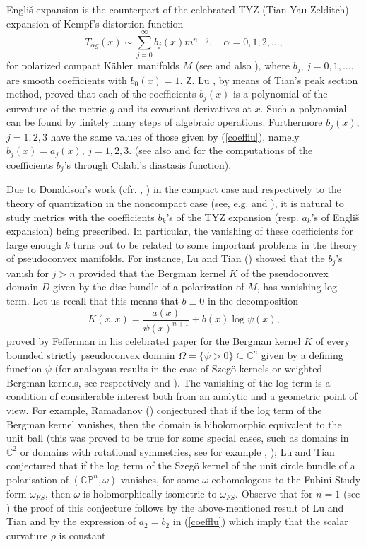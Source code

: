\documentclass[11pt, reqno]{amsart}
\begin{document}
Engli\v{s} expansion is the counterpart of the celebrated TYZ (Tian-Yau-Zelditch) expansion
of Kempf's distortion function
$$T_{\alpha g}(x) \sim
\sum_{j=0}^\infty  b_j(x)m^{n-j},\quad \alpha=0,1,2,\dots,$$
 for polarized compact {K\"{a}hler}\ manifolds $M$ (see  \cite{ze}
and  also \cite{arlquant}),
where  $b_j$, $j=0,1, \ldots$, are smooth coefficients with $b_0(x)=1$.
Z. Lu \cite{lu}, by means of  Tian's peak section method,
proved  that  each of the coefficients $b_j(x)$
 is a polynomial of the curvature  of the metric $g$ and its covariant
derivatives at $x$. Such a polynomial can be
found by finitely many steps of algebraic operations. Furthermore
$b_j(x)$, $j=1, 2, 3$ have the same values of those given by
(\ref{coefflu}), namely $b_j(x)=a_j(x)$, $j=1, 2, 3$.
(see also \cite{loianal} and \cite{loismooth} for the
computations of the coefficients $b_j$'s through Calabi's
diastasis function).

Due to Donaldson's work (cfr. \cite{donaldson},
\cite{do2}) in the compact case and respectively to the theory of
quantization  in the noncompact case (see, e.g. \cite{Ber1} and \cite{CGR}),
 it is  natural to study metrics with the coefficients $b_k$'s of  the  TYZ expansion
 (resp.    $a_k$'s of  Engli\v{s} expansion)  being prescribed. In particular, the vanishing of these coefficients for large enough $k$ turns out to be related to some important problems in the theory of pseudoconvex manifolds. For instance, Lu and Tian (\cite{lutian}) showed that the $b_j$'s vanish for $j > n$ provided that the Bergman kernel $K$ of the pseudoconvex domain $D$ given by the disc bundle of a polarization of $M$, has vanishing log term. Let us recall that this means that $b \equiv 0$ in the decomposition
\begin{equation}\label{fefferman}
K(x,x) = \frac{a(x)}{\psi(x)^{n+1}} + b(x) \log \psi(x) ,
\end{equation}
proved by Fefferman in his celebrated paper \cite{F} for the Bergman kernel $K$ of every bounded strictly pseudoconvex domain $\Omega = \{\psi > 0 \} \subseteq {\mathbb{C}}^n$ given by a defining function $\psi$ (for analogous results in the case of Szeg\"{o} kernels or weighted Bergman kernels, see respectively \cite{lutian} and \cite{englis3}). The vanishing of the log term is a condition of considerable interest both from an analytic and a geometric point of view. For example, Ramadanov (\cite{R}) conjectured that if the log term of the Bergman kernel vanishes, then the domain is biholomorphic equivalent to the unit ball (this was proved to be true for some special cases, such as domains in ${\mathbb{C}}^2$ or domains with rotational symmetries, see for example \cite{BoCo}, \cite{Bout}); Lu and Tian conjectured that if the log term of the Szeg\"{o} kernel of the unit circle bundle of a polarisation of $({\mathbb{C}} {\mathbb{P}}^n, \omega)$ vanishes, for some $\omega$ cohomologous to the Fubini-Study form $\omega_{FS}$, then $\omega$ is holomorphically isometric to $\omega_{FS}$. Observe that for $n=1$ (see \cite[Theorem 1.1]{lutian}) the proof of this conjecture follows by the above-mentioned result of Lu and Tian and by the expression of $a_2=b_2$  in  (\ref{coefflu}) which imply that  the  scalar curvature $\rho$  is  constant.
\end{document}
